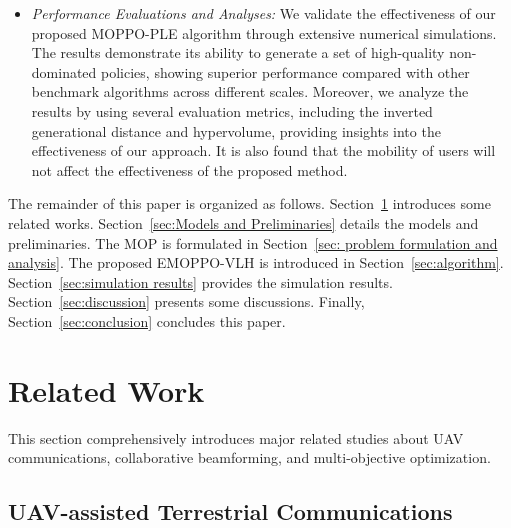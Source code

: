 \documentclass[10pt,journal,compsoc]{IEEEtran}
\begin{document}
\begin{itemize}
    \item \textit{Performance Evaluations and Analyses:} We validate the effectiveness of our proposed MOPPO-PLE algorithm through extensive numerical simulations. The results demonstrate its ability to generate a set of high-quality non-dominated policies, showing superior performance compared with other benchmark algorithms across different scales. Moreover, we analyze the results by using several evaluation metrics, including the inverted generational distance and hypervolume, providing insights into the effectiveness of our approach. It is also found that the mobility of users will not affect the effectiveness of the proposed method.
\end{itemize}

\par The remainder of this paper is organized as follows. Section~\ref{sec:Related Work} introduces some related works. Section~\ref{sec:Models and Preliminaries} details the models and preliminaries. The MOP is formulated in Section~\ref{sec: problem formulation and analysis}. The proposed EMOPPO-VLH is introduced in Section~\ref{sec:algorithm}. Section~\ref{sec:simulation results} provides the simulation results. Section~\ref{sec:discussion} presents some discussions. Finally, Section~\ref{sec:conclusion} concludes this paper. 



%
%
\section{Related Work}
\label{sec:Related Work}

\par This section comprehensively introduces major related studies about UAV communications, collaborative beamforming, and multi-objective optimization.

\subsection{UAV-assisted Terrestrial Communications}
\label{subsec:UAV-assisted Terrestrial Communications}
\end{document}

